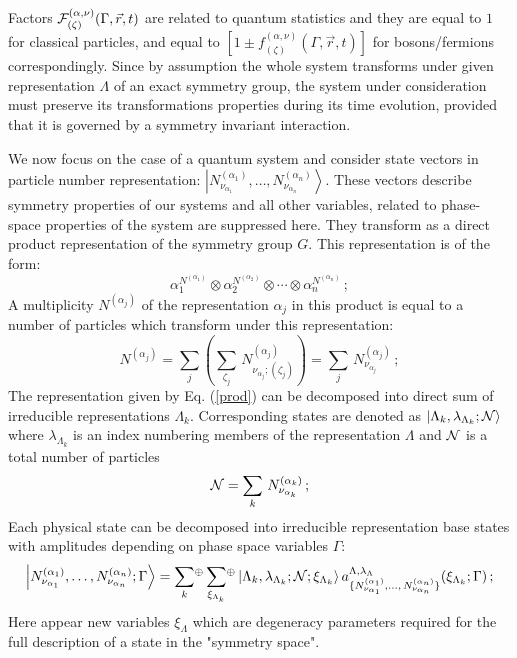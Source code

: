 \documentclass[a4paper,11pt]{article}
\begin{document}
Factors ${\cal F}^{(\alpha,\nu)}_{(\zeta)}(\Gamma,\vec r,t)$ are
related to quantum statistics and they are equal to $1$ for
classical particles, and equal to $[1\pm
f^{(\alpha,\nu)}_{(\zeta)}(\Gamma,\vec r,t)]$ for bosons/fermions
correspondingly. Since by assumption the whole system transforms
under given representation $\Lambda$ of an exact symmetry group,
the system under consideration must preserve its transformations
properties during its time evolution, provided that it is governed
by a symmetry invariant interaction.

We now focus on the case of a quantum system and consider state
vectors in particle number representation: $\left\vert
N^{(\alpha_1)}_{\nu_{\alpha_1}},\dots,
N^{(\alpha_n)}_{\nu_{\alpha_n}}\right\rangle .$ These vectors
describe symmetry properties of our systems and all other
variables, related to phase-space properties of the system are
suppressed here. They transform as a direct product representation
of the symmetry group $G$. This representation is of the form:
\begin{equation}
\alpha_1^{N^{(\alpha_1)}} \otimes \alpha_2^{N^{(\alpha_2)}}
\otimes \cdots \otimes \alpha_n^{N^{(\alpha_n)}}\,; \label{prod}
\end{equation}
A multiplicity $N^{(\alpha_j)}$ of the representation $\alpha_j$
in this product is equal to a number of particles which transform
under this representation:
\begin{equation}
N^{(\alpha_j)} = \sum_j\left(\sum_{\zeta_j}\,
N^{(\alpha_j)}_{\nu_{\alpha_j};(\zeta_j)}\right)= \sum_j\,
N^{(\alpha_j)}_{\nu_{\alpha_j}}\,; \label{pnumber}
\end{equation}
The representation given by Eq. (\ref{prod}) can be decomposed
into direct sum of irreducible representations $\Lambda_k$.
Corresponding states are denoted as $\left\vert \Lambda_k,
\lambda_{\Lambda_k}; {\cal N}\right\rangle$ where
$\lambda_{\Lambda_k}$ is an index numbering members of the
representation $\Lambda$ and ${\cal N}$ is a total number of
particles
\begin{equation}
{\cal N}=\sum_k\, N^{(\alpha_k)}_{\nu_{\alpha_k}}\,;\label{number}
\end{equation}
Each physical state can be decomposed into irreducible
representation base states with amplitudes depending on phase
space variables $\Gamma$:
\begin{eqnarray} \label{dsum}
\left\vert N^{(\alpha_1)}_{\nu_{\alpha_1}},\dots, N^{(\alpha_n)}_{
\nu_{\alpha_n}};\Gamma\right\rangle=
\sum_{k}\!^{\oplus}\sum_{\xi_{\Lambda_k}}\!^{\oplus} \left\vert
\Lambda_k, \lambda_{\Lambda_k}; {{\cal
N};\xi_{\Lambda_k}}\right\rangle
a^{\Lambda,\lambda_{\Lambda}}_{\{N^{(\alpha_1)}_{\nu_{\alpha_1}},
\dots,\,N^{(\alpha_n)}_{\nu_{\alpha_n}}\}}(\xi_{\Lambda_k};\Gamma)\,;
\end{eqnarray}
Here appear new variables $\xi_{\Lambda}$ which are degeneracy
parameters required for the full description of a state in the
"symmetry space".
\end{document}
